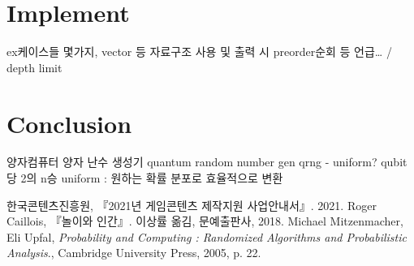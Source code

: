 \documentclass[11pt]{article}
\begin{document}
\section{Implement}
ex케이스들 몇가지, vector 등 자료구조 사용 및 출력 시 preorder순회 등 언급… / depth limit

\section{Conclusion}
양자컴퓨터 양자 난수 생성기
quantum random number gen qrng - uniform?
qubit 당 2의 n승 uniform : 원하는 확률 분포로 효율적으로 변환

\begin{thebibliography}{99}
한국콘텐츠진흥원, 『2021년 게임콘텐츠 제작지원 사업안내서』. 2021.
Roger Caillois, 『놀이와 인간』. 이상률 옮김, 문예출판사, 2018.
Michael Mitzenmacher, Eli Upfal, \textit{Probability and Computing : Randomized Algorithms and Probabilistic Analysis}., Cambridge University Press, 2005, p. 22.

\end{thebibliography}
\end{document}
